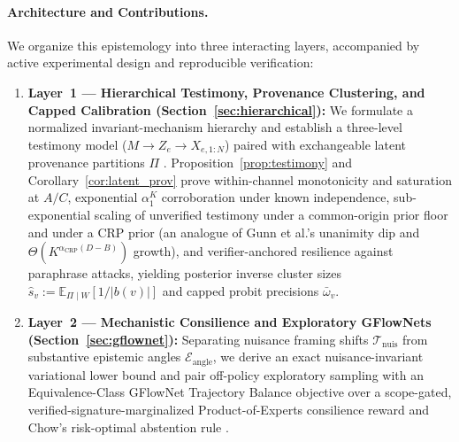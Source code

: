 \documentclass[11pt,a4paper]{article}
\theoremstyle{definition}
\theoremstyle{remark}
\newcommand{\E}{\mathbb{E}}
\begin{document}
\paragraph{Architecture and Contributions.}
We organize this epistemology into three interacting layers, accompanied by active experimental design and reproducible verification:
\begin{enumerate}[leftmargin=1.8em]
  \item \textbf{Layer~1 --- Hierarchical Testimony, Provenance Clustering, and Capped Calibration (Section~\ref{sec:hierarchical}):} We formulate a normalized invariant-mechanism hierarchy and establish a three-level testimony model ($M \to Z_e \to X_{e,1:N}$) paired with exchangeable latent provenance partitions $\Pi$ \cite{bovens2003bayesian,dong2009integrating,aldous1985exchangeability,pitman2006combinatorial}. Proposition~\ref{prop:testimony} and Corollary~\ref{cor:latent_prov} prove within-channel monotonicity and saturation at $A/C$, exponential $\alpha_1^K$ corroboration under known independence, sub-exponential scaling of unverified testimony under a common-origin prior floor and under a CRP prior (an analogue of Gunn et al.'s unanimity dip \cite{gunn2016too} and $\Theta(K^{\alpha_{\mathrm{CRP}}(D-B)})$ growth), and verifier-anchored resilience against paraphrase attacks, yielding posterior inverse cluster sizes $\hat{s}_v := \E_{\Pi \mid W}[1/|b(v)|]$ and capped probit precisions $\bar{\omega}_v$.
  \item \textbf{Layer~2 --- Mechanistic Consilience and Exploratory GFlowNets (Section~\ref{sec:gflownet}):} Separating nuisance framing shifts $\mathcal{T}_{\mathrm{nuis}}$ from substantive epistemic angles $\mathcal{E}_{\mathrm{angle}}$, we derive an exact nuisance-invariant variational lower bound and pair off-policy exploratory sampling with an Equivalence-Class GFlowNet Trajectory Balance objective \cite{malkin2022trajectory,malkin2023gflownets,hu2024amortizing,bengio2025scientist} over a scope-gated, verified-signature-marginalized Product-of-Experts consilience reward \cite{whewell1840philosophy} and Chow's risk-optimal abstention rule \cite{chow1970optimum}.

\end{enumerate}
\end{document}
